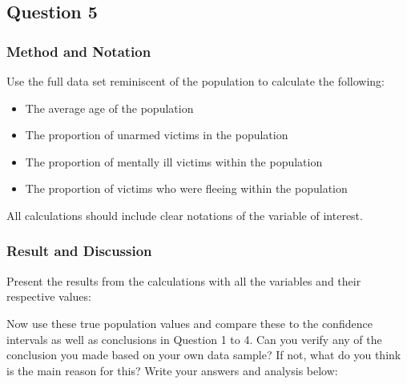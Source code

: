 \documentclass[a4paper, 10pt,serif]{article}
\begin{document}
\newpage
\subsection*{Question 5}

\subsubsection*{Method and Notation}

Use the full data set reminiscent of the population to calculate the following: 
\begin{itemize}
    \item The average age of the population
    \item The proportion of unarmed victims in the population
    \item The proportion of mentally ill victims within the population
    \item The proportion of victims who were fleeing within the population
\end{itemize}
\noindent All calculations should include clear notations of the variable of interest. 

\bigskip
\bigskip
\bigskip
\bigskip

\subsubsection*{Result and Discussion}

Present the results from the calculations with all the variables and their respective values:

\bigskip
\bigskip
\bigskip
\bigskip

\noindent
Now use these true population values and compare these to the confidence intervals as well as conclusions in Question 1 to 4. Can you verify any of the conclusion you made based on your own data sample? If not, what do you think is the main reason for this? Write your answers and analysis below: 

\bigskip
\bigskip
\bigskip
\bigskip
\end{document}
